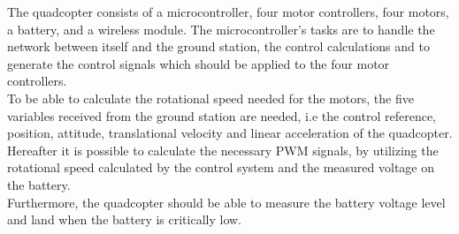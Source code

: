 The quadcopter consists of a microcontroller, four motor controllers, four motors, a battery, and a wireless module. The microcontroller's tasks are to handle the network between itself and the ground station, the control calculations and to generate the control signals which should be applied to the four motor controllers.\\
To be able to calculate the rotational speed needed for the motors, the five variables received from the ground station are needed, i.e the control reference, position, attitude, translational velocity and linear acceleration of the quadcopter. Hereafter it is possible to calculate the necessary PWM signals, by utilizing the rotational speed calculated by the control system and the measured voltage on the battery. \\
Furthermore, the quadcopter should be able to measure the battery voltage level and land when the battery is critically low.








